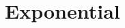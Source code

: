 \documentclass[Exponential.tex]{subfiles}
\begin{document}
\chapter{Exponential}
\label{chp:Exponential}
\end{document}
